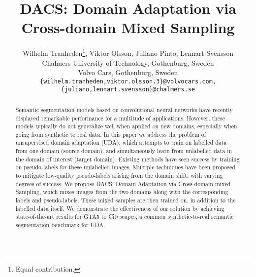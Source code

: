 \documentclass[10pt,twocolumn,letterpaper]{article}
\begin{document}
\title{DACS: Domain Adaptation via Cross-domain Mixed Sampling}

\author{Wilhelm Tranheden\thanks{Equal contribution.},
Viktor Olsson{\footnotemark[\value{footnote}]},
Juliano Pinto,
Lennart Svensson\\
Chalmers University of Technology, Gothenburg, Sweden\\
Volvo Cars, Gothenburg, Sweden\\
{\tt\small \{wilhelm.tranheden,viktor.olsson.3\}@volvocars.com, \{juliano,lennart.svensson\}@chalmers.se}
}

\maketitle


\begin{abstract}
   Semantic segmentation models based on convolutional neural networks have recently displayed remarkable performance for a multitude of applications. However, these models typically do not generalize well when applied on new domains, especially when going from synthetic to real data. In this paper we address the problem of unsupervised domain adaptation (UDA), which attempts to train on labelled data from one domain (source domain), and simultaneously learn from unlabelled data in the domain of interest (target domain). Existing methods have seen success by training on pseudo-labels for these unlabelled images. Multiple techniques have been proposed to mitigate low-quality pseudo-labels arising from the domain shift, with varying degrees of success. We propose DACS: Domain Adaptation via Cross-domain mixed Sampling, which mixes images from the two domains along with the corresponding labels and pseudo-labels. These mixed samples are then trained on, in addition to the labelled data itself. We demonstrate the effectiveness of our solution by achieving state-of-the-art results for GTA5 to Cityscapes, a common synthetic-to-real semantic segmentation benchmark for UDA.
\end{abstract}
\end{document}
